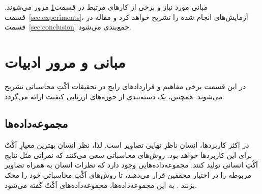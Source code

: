 \documentclass[twocolumn]{article}
\begin{document}
مبانی مورد نیاز و برخی از کارهای مرتبط در قسمت\ref{sec:review} مرور می‌شوند. قسمت~\ref{sec:experiments}، آزمایش‌های انجام شده را تشریح خواهد کرد و مقاله در قسمت~\ref{sec:conclusion} جمع‌بندی می‌شود.
\section{مبانی و مرور ادبیات} \label{sec:review}
در این قسمت برخی مفاهیم و قرارداد‌های رایج در تحقیقات اَکْتِ محاسباتی تشریح می‌شوند. همچنین، یک دسته‌بندی از حوزه‌های ارزیابی کیفیت ارائه می‌گردد.
\subsection{مجموعه‌داده‌ها} \label{sec:datasets}
در اکثر کاربردها، انسان ناظرِ نهایی تصاویر است. لذا، نظر انسان بهترین معیارِ اَکْتْ برای این کاربردها خواهد بود. روش‌های محاسباتی سعی می‌کنند که نمراتی مثل نتایج اَکْتِ انسانی تولید کنند. مجموعه‌داده‌هایی وجود دارد که نظرات انسان به همراه تصاویر مربوطه را در اختیار محققین قرار می‌دهند، تا روش‌های اَکْتِ محاسباتی خود را محک بزنند \cite{mohammadi2014subjective}. به این مجموعه‌داده‌ها، مجموعه‌داده‌های اَکْتْ گفته می‌شود.
\end{document}
